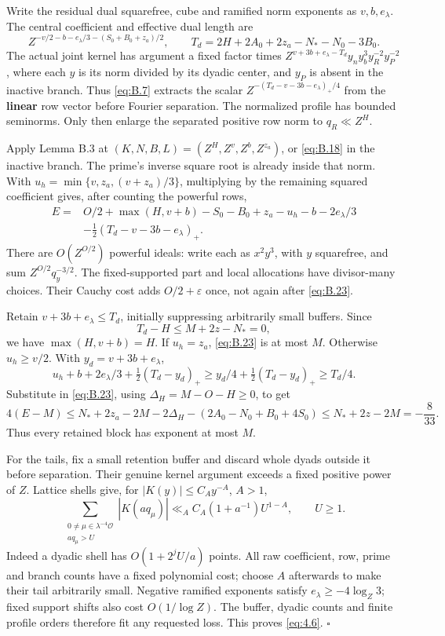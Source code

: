 \documentclass[11pt,a4paper]{article}
\begin{document}
Write the residual dual squarefree, cube and ramified norm exponents as \(v,b,e_\lambda\). The central coefficient and effective dual length are \[
 Z^{-v/2-b-e_\lambda/3-(S_0+B_0+z_a)/2},\qquad
 T_d=2H+2A_0+2z_a-N_*-N_0-3B_0.
\tag{B.22}\label{eq:B.22}
\] The actual joint kernel has argument a fixed factor times \(Z^{v+3b+e_\lambda-T_d}y_ny_b^3y_R^{-2}y_P^{-2}\), where each \(y\) is its norm divided by its dyadic center, and \(y_P\) is absent in the inactive branch. Thus \eqref{eq:B.7} extracts the scalar \(Z^{-(T_d-v-3b-e_\lambda)_+/4}\) from the \textbf{linear} row vector before Fourier separation. The normalized profile has bounded seminorms. Only then enlarge the separated positive row norm to \(q_R\ll Z^H\).

Apply Lemma B.3 at \((K,N,B,L)=(Z^H,Z^v,Z^b,Z^{z_a})\), or \eqref{eq:B.18} in the inactive branch. The prime's inverse square root is already inside that norm. With \(u_h=\min\{v,z_a,(v+z_a)/3\}\), multiplying by the remaining squared coefficient gives, after counting the powerful rows, \[
\begin{aligned}
 E={}&O/2+\max(H,v+b)-S_0-B_0+z_a-u_h-b-2e_\lambda/3\\
    &-\tfrac12(T_d-v-3b-e_\lambda)_+.
\end{aligned}
\tag{B.23}\label{eq:B.23}
\] There are \(O(Z^{O/2})\) powerful ideals: write each as \(x^2y^3\), with \(y\) squarefree, and sum \(Z^{O/2}q_y^{-3/2}\). The fixed-supported part and local allocations have divisor-many choices. Their Cauchy cost adds \(O/2+\varepsilon\) once, not again after \eqref{eq:B.23}.

Retain \(v+3b+e_\lambda\le T_d\), initially suppressing arbitrarily small buffers. Since \[
 T_d-H\le M+2z-N_*=0,
\] we have \(\max(H,v+b)=H\). If \(u_h=z_a\), \eqref{eq:B.23} is at most \(M\). Otherwise \(u_h\ge v/2\). With \(y_d=v+3b+e_\lambda\), \[
 u_h+b+2e_\lambda/3+\tfrac12(T_d-y_d)_+
 \ge y_d/4+\tfrac12(T_d-y_d)_+\ge T_d/4.
\] Substitute in \eqref{eq:B.23}, using \(\Delta_H=M-O-H\ge0\), to get \[
 4(E-M)\le N_*+2z_a-2M-2\Delta_H-(2A_0-N_0+B_0+4S_0)
 \le N_*+2z-2M=-\frac8{33}.
\tag{B.24}\label{eq:B.24}
\] Thus every retained block has exponent at most \(M\).

For the tails, fix a small retention buffer and discard whole dyads outside it before separation. Their genuine kernel argument exceeds a fixed positive power of \(Z\). Lattice shells give, for \(|K(y)|\le C_Ay^{-A}\), \(A>1\), \[
 \sum_{\substack{0\ne\mu\in\lambda^{-4}\mathcal O\\a q_\mu>U}}
 |K(aq_\mu)|\ll_A C_A(1+a^{-1})U^{1-A},\qquad U\ge1.
\tag{B.25}\label{eq:B.25}
\] Indeed a dyadic shell has \(O(1+2^jU/a)\) points. All raw coefficient, row, prime and branch counts have a fixed polynomial cost; choose \(A\) afterwards to make their tail arbitrarily small. Negative ramified exponents satisfy \(e_\lambda\ge-4\log_Z3\); fixed support shifts also cost \(O(1/\log Z)\). The buffer, dyadic counts and finite profile orders therefore fit any requested loss. This proves \eqref{eq:4.6}. \hfill\(\square\)
\end{document}
